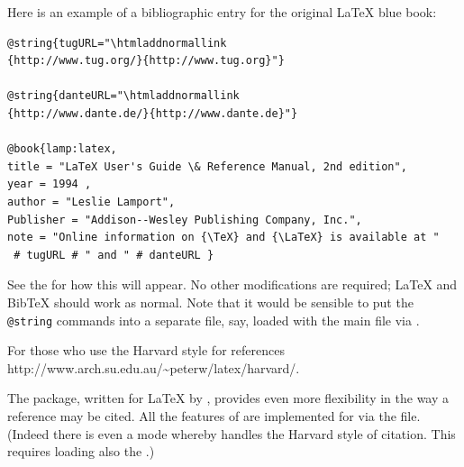 \bigskip
{}%
%
\html{\\}%
\noindent
Here is an example of a bibliographic entry for the original
\LaTeX{} \cite{lamp:latex} blue book:\nobreak
\begin{small}
\begin{verbatim}
@string{tugURL="\htmladdnormallink
{http://www.tug.org/}{http://www.tug.org}"}

@string{danteURL="\htmladdnormallink
{http://www.dante.de/}{http://www.dante.de}"}

@book{lamp:latex,
title = "LaTeX User's Guide \& Reference Manual, 2nd edition",
year = 1994 ,
author = "Leslie Lamport",
Publisher = "Addison--Wesley Publishing Company, Inc.",
note = "Online information on {\TeX} and {\LaTeX} is available at "
 # tugURL # " and " # danteURL }
\end{verbatim}
\end{small}
See the  for how this will appear.\html{\\}
No other modifications are required; \LaTeX{} and Bib\TeX{} should work as normal.
%
%
Note that it would be sensible to put the \texttt{@string} commands
into a separate file,  say, 
loaded with the main file via\html{\\} \verb||.%

\smallskip{}%
\label{harvard}\html{\\}%
\noindent
For those who use the Harvard style for references
%
{http://www.arch.su.edu.au/\~{}peterw/latex/harvard/}.

%
%
%
The  package, written for \LaTeX{} by \PatrickDaly,
provides even more flexibility in the way a reference may be cited. 
All the features of  are implemented 
for \latextohtml{} via the  file.
(Indeed there is even a mode whereby  handles
the Harvard style of citation. 
This requires loading also the  .)

